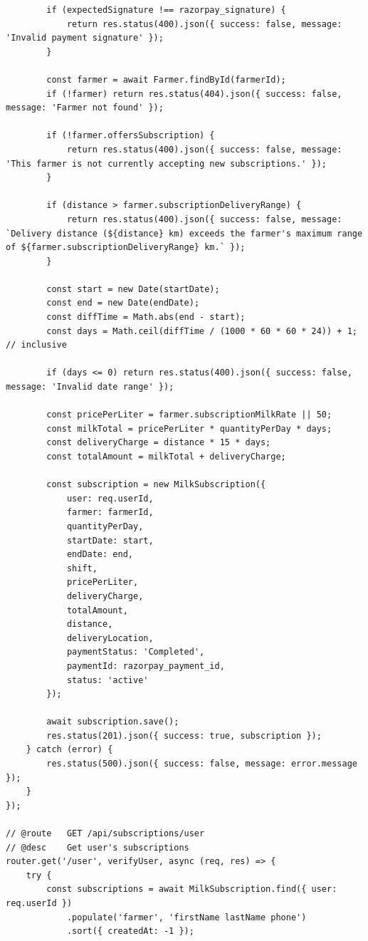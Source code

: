 \documentclass[12pt,a4paper]{report}
\begin{document}
\begin{lstlisting}
        if (expectedSignature !== razorpay_signature) {
            return res.status(400).json({ success: false, message: 'Invalid payment signature' });
        }

        const farmer = await Farmer.findById(farmerId);
        if (!farmer) return res.status(404).json({ success: false, message: 'Farmer not found' });

        if (!farmer.offersSubscription) {
            return res.status(400).json({ success: false, message: 'This farmer is not currently accepting new subscriptions.' });
        }

        if (distance > farmer.subscriptionDeliveryRange) {
            return res.status(400).json({ success: false, message: `Delivery distance (${distance} km) exceeds the farmer's maximum range of ${farmer.subscriptionDeliveryRange} km.` });
        }

        const start = new Date(startDate);
        const end = new Date(endDate);
        const diffTime = Math.abs(end - start);
        const days = Math.ceil(diffTime / (1000 * 60 * 60 * 24)) + 1; // inclusive

        if (days <= 0) return res.status(400).json({ success: false, message: 'Invalid date range' });

        const pricePerLiter = farmer.subscriptionMilkRate || 50;
        const milkTotal = pricePerLiter * quantityPerDay * days;
        const deliveryCharge = distance * 15 * days;
        const totalAmount = milkTotal + deliveryCharge;

        const subscription = new MilkSubscription({
            user: req.userId,
            farmer: farmerId,
            quantityPerDay,
            startDate: start,
            endDate: end,
            shift,
            pricePerLiter,
            deliveryCharge,
            totalAmount,
            distance,
            deliveryLocation,
            paymentStatus: 'Completed',
            paymentId: razorpay_payment_id,
            status: 'active'
        });

        await subscription.save();
        res.status(201).json({ success: true, subscription });
    } catch (error) {
        res.status(500).json({ success: false, message: error.message });
    }
});

// @route   GET /api/subscriptions/user
// @desc    Get user's subscriptions
router.get('/user', verifyUser, async (req, res) => {
    try {
        const subscriptions = await MilkSubscription.find({ user: req.userId })
            .populate('farmer', 'firstName lastName phone')
            .sort({ createdAt: -1 });


\end{lstlisting}
\end{document}

